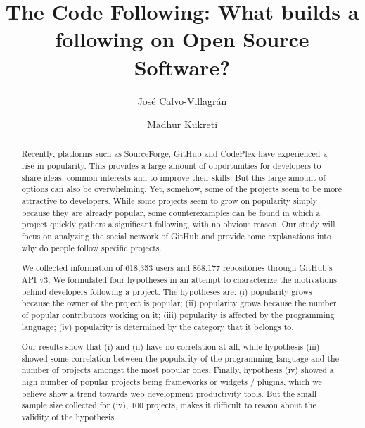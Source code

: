 \documentclass{acm_proc_article-sp}
\begin{document}
\title{The Code Following: What builds a following on Open Source Software?}
\author{
\alignauthor
Jos{\'e} Calvo-Villagr{\'a}n
\and
\alignauthor
Madhur Kukreti
}

\maketitle

\begin{abstract}
Recently, platforms such as SourceForge, GitHub and CodePlex have experienced a rise in popularity. This provides a large amount of opportunities for developers to share ideas, common interests and to improve their skills. But this large amount of options can also be overwhelming. Yet, somehow, some of the projects seem to be more attractive to developers. While some projects seem to grow on popularity simply because they are already popular, some counterexamples can be found in which a project quickly gathers a significant following, with no obvious reason. Our study will focus on analyzing the social network of GitHub and provide some explanations into why do people follow specific projects.

We collected information of 618,353 users and 868,177 repositories through GitHub's API v3. We formulated four hypotheses in an attempt to characterize the motivations behind developers following a project. The hypotheses are: (i) popularity grows because the owner of the project is popular; (ii) popularity grows because the number of popular contributors working on it; (iii) popularity is affected by the programming language; (iv) popularity is determined by the category that it belongs to.

Our results show that (i) and (ii) have no correlation at all, while hypothesis (iii) showed some correlation between the popularity of the programming language and the number of projects amongst the most popular ones. Finally, hypothesis (iv) showed a high number of popular projects being frameworks or widgets / plugins, which we believe show a trend towards web development productivity tools. But the small sample size collected for (iv), 100 projects, makes it difficult to reason about the validity of the hypothesis.
\end{abstract}













\end{document}
